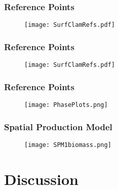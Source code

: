 \documentclass{beamer}
\begin{document}
\begin{frame}
\frametitle{Reference Points}

\begin{figure}
        \begin{center}
            \texttt{[image: SurfClamRefs.pdf]}
        \end{center}
    \end{figure}


\end{frame}



\begin{frame}
\frametitle{Reference Points}

\begin{figure}
        \begin{center}
            \texttt{[image: SurfClamRefs.pdf]}
        \end{center}
    \end{figure}


\end{frame}




\begin{frame}
\frametitle{Reference Points}

\begin{figure}
        \begin{center}
            \texttt{[image: PhasePlots.png]}
        \end{center}
    \end{figure}


\end{frame}
\begin{frame}
\frametitle{Spatial Production Model}

\begin{figure}
        \begin{center}
            \texttt{[image: SPM1biomass.png]}
        \end{center}
    \end{figure}


\end{frame}

\section{Discussion}
 
\end{document}
